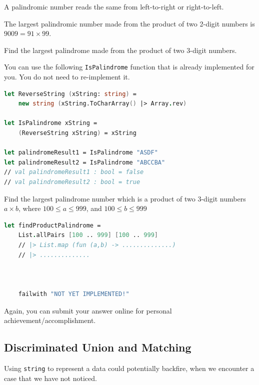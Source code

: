 \documentclass[12pt]{article}
\begin{document}
A palindromic number reads the same from left-to-right or right-to-left. 

The largest palindromic number made from the product of two 2-digit numbers is $9009 = 91 \times 99$.

Find the largest palindrome made from the product of two 3-digit numbers.

You can use the following \texttt{IsPalindrome} function that is already implemented for you. You do not need to re-implement it.
\begin{lstlisting}[language=FSharp]
let ReverseString (xString: string) =
    new string (xString.ToCharArray() |> Array.rev)

let IsPalindrome xString =
    (ReverseString xString) = xString

let palindromeResult1 = IsPalindrome "ASDF"   
let palindromeResult2 = IsPalindrome "ABCCBA" 
// val palindromeResult1 : bool = false
// val palindromeResult2 : bool = true
\end{lstlisting}
Find the largest palindrome number which is a product of two 3-digit numbers $a \times b$, where $100 \leq a \leq 999$, and $100 \leq b \leq 999$
\begin{lstlisting}[language=FSharp]
let findProductPalindrome =
    List.allPairs [100 .. 999] [100 .. 999]
    // |> List.map (fun (a,b) -> ..............)
    // |> ..............



    failwith "NOT YET IMPLEMENTED!"
\end{lstlisting}
Again, you can submit your answer online for personal achievement/accomplishment.

\vfill
\pagebreak
\subsection{Discriminated Union and Matching}
Using \texttt{string} to represent a data could potentially backfire, when we encounter a case that we have not noticed.
\end{document}
